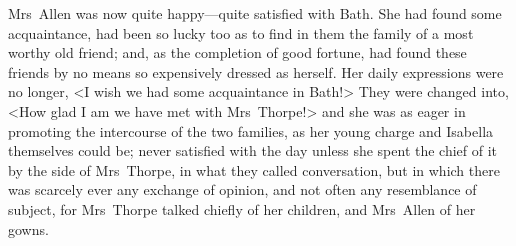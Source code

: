  Mrs~Allen was now quite happy—quite satisfied with Bath. She had found some acquaintance, had been so lucky too as to find in them the family of a most worthy old friend; and, as the completion of good fortune, had found these friends by no means so expensively dressed as herself. Her daily expressions were no longer, <I wish we had some acquaintance in Bath!> They were changed into, <How glad I am we have met with Mrs~Thorpe!> and she was as eager in promoting the intercourse of the two families, as her young charge and Isabella themselves could be; never satisfied with the day unless she spent the chief of it by the side of Mrs~Thorpe, in what they called conversation, but in which there was scarcely ever any exchange of opinion, and not often any resemblance of subject, for Mrs~Thorpe talked chiefly of her children, and Mrs~Allen of her gowns. 

